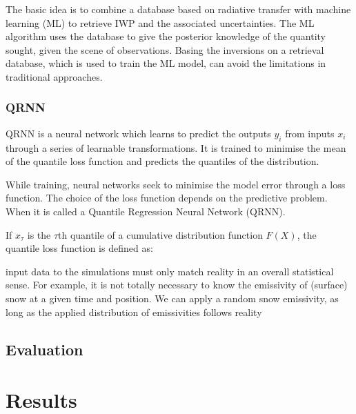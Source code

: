 \documentclass[amt, manuscript]{copernicus}
\begin{document}
The basic idea is to combine a database based on radiative transfer with machine learning (ML) to retrieve IWP and the associated uncertainties.  The ML algorithm uses the database to give the posterior knowledge of the quantity sought, given the scene of observations. Basing the inversions on a retrieval database, which is used to train the ML model, can avoid the limitations in traditional approaches.



\subsubsection{QRNN}
\label{sec:QRNN}

QRNN is a neural network which learns to predict the outputs {$y_i$} from inputs {$x_i$} through a series of learnable transformations. It is trained to minimise the mean of the quantile loss function and predicts the quantiles of the distribution. 

 While training, neural networks seek to minimise the model error through a loss function. The choice of the loss function depends on the predictive problem. When  it is called a Quantile Regression Neural Network (QRNN). 

If $x_{\tau}$ is the $\tau$th quantile of a cumulative distribution function $F(X)$, the quantile loss function is defined as:




 input data to the simulations must only match reality in an overall statistical sense. For example, it is not totally necessary to know the emissivity of (surface) snow at a given time and position. We can apply a random snow emissivity, as long as the applied distribution of emissivities follows reality



\subsection{Evaluation}



\section{Results}
\end{document}
